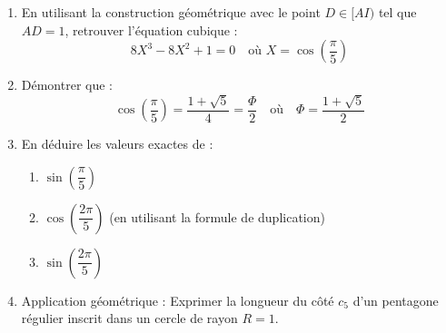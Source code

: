\documentclass[11pt,a4paper]{article}
\begin{document}
\begin{enumerate}[label=\arabic*.]
    \item En utilisant la construction géométrique avec le point $D \in [AI)$ tel que $AD = 1$, retrouver l'équation cubique :
    \[
    8X^3 - 8X^2 + 1 = 0 \quad \text{où } X = \cos\left(\frac{\pi}{5}\right)
    \]
    \item Démontrer que :
    \[
    \cos\left(\frac{\pi}{5}\right) = \frac{1 + \sqrt{5}}{4} = \frac{\Phi}{2} \quad \text{où} \quad \Phi = \frac{1+\sqrt{5}}{2}
    \]
    \item En déduire les valeurs exactes de :
    \begin{enumerate}
        \item $\sin\left(\dfrac{\pi}{5}\right)$
        \item $\cos\left(\dfrac{2\pi}{5}\right)$ (en utilisant la formule de duplication)
        \item $\sin\left(\dfrac{2\pi}{5}\right)$
    \end{enumerate}
    \item Application géométrique : Exprimer la longueur du côté $c_5$ d'un pentagone régulier inscrit dans un cercle de rayon $R = 1$.
\end{enumerate}
\end{document}
